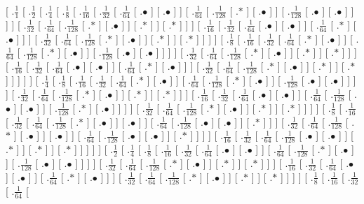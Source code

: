 \documentclass[a4paper,10pt]{article}
\begin{document}
\begin{landscape}
{[ .$\frac{1}{1}$  [ .$\frac{1}{2}$  [ .$\frac{1}{4}$  [ .$\frac{1}{8}$  [ .$\frac{1}{16}$  [ .$\frac{1}{32}$  [ .$\frac{1}{64}$  [ .$\bullet$ ]  [ .$\bullet$ ]  ]  [ .$\frac{1}{64}$  [ .$\frac{1}{128}$  [ .$*$ ]  [ .$\bullet$ ]  ]  [ .$\frac{1}{128}$  [ .$\bullet$ ]  [ .$\bullet$ ]  ]  ]  ]  [ .$\frac{1}{32}$  [ .$\frac{1}{64}$  [ .$\frac{1}{128}$  [ .$*$ ]  [ .$\bullet$ ]  ]  [ .$*$ ]  ]  [ .$*$ ]  ]  ]  [ .$\frac{1}{16}$  [ .$\frac{1}{32}$  [ .$\frac{1}{64}$  [ .$\bullet$ ]  [ .$\bullet$ ]  ]  [ .$\frac{1}{64}$  [ .$*$ ]  [ .$\bullet$ ]  ]  ]  [ .$\frac{1}{32}$  [ .$\frac{1}{64}$  [ .$\frac{1}{128}$  [ .$*$ ]  [ .$\bullet$ ]  ]  [ .$*$ ]  ]  [ .$*$ ]  ]  ]  ]  [ .$\frac{1}{8}$  [ .$\frac{1}{16}$  [ .$\frac{1}{32}$  [ .$\frac{1}{64}$  [ .$*$ ]  [ .$\bullet$ ]  ]  [ .$\frac{1}{64}$  [ .$\frac{1}{128}$  [ .$*$ ]  [ .$\bullet$ ]  ]  [ .$\frac{1}{128}$  [ .$\bullet$ ]  [ .$\bullet$ ]  ]  ]  ]  [ .$\frac{1}{32}$  [ .$\frac{1}{64}$  [ .$\frac{1}{128}$  [ .$*$ ]  [ .$\bullet$ ]  ]  [ .$*$ ]  ]  [ .$*$ ]  ]  ]  [ .$\frac{1}{16}$  [ .$\frac{1}{32}$  [ .$\frac{1}{64}$  [ .$\bullet$ ]  [ .$\bullet$ ]  ]  [ .$\frac{1}{64}$  [ .$*$ ]  [ .$\bullet$ ]  ]  ]  [ .$\frac{1}{32}$  [ .$\frac{1}{64}$  [ .$\frac{1}{128}$  [ .$*$ ]  [ .$\bullet$ ]  ]  [ .$*$ ]  ]  [ .$*$ ]  ]  ]  ]  ]  [ .$\frac{1}{4}$  [ .$\frac{1}{8}$  [ .$\frac{1}{16}$  [ .$\frac{1}{32}$  [ .$\frac{1}{64}$  [ .$*$ ]  [ .$\bullet$ ]  ]  [ .$\frac{1}{64}$  [ .$\frac{1}{128}$  [ .$*$ ]  [ .$\bullet$ ]  ]  [ .$\frac{1}{128}$  [ .$\bullet$ ]  [ .$\bullet$ ]  ]  ]  ]  [ .$\frac{1}{32}$  [ .$\frac{1}{64}$  [ .$\frac{1}{128}$  [ .$*$ ]  [ .$\bullet$ ]  ]  [ .$*$ ]  ]  [ .$*$ ]  ]  ]  [ .$\frac{1}{16}$  [ .$\frac{1}{32}$  [ .$\frac{1}{64}$  [ .$\bullet$ ]  [ .$\bullet$ ]  ]  [ .$\frac{1}{64}$  [ .$\frac{1}{128}$  [ .$\bullet$ ]  [ .$\bullet$ ]  ]  [ .$\frac{1}{128}$  [ .$*$ ]  [ .$\bullet$ ]  ]  ]  ]  [ .$\frac{1}{32}$  [ .$\frac{1}{64}$  [ .$\frac{1}{128}$  [ .$*$ ]  [ .$\bullet$ ]  ]  [ .$*$ ]  ]  [ .$*$ ]  ]  ]  ]  [ .$\frac{1}{8}$  [ .$\frac{1}{16}$  [ .$\frac{1}{32}$  [ .$\frac{1}{64}$  [ .$\frac{1}{128}$  [ .$*$ ]  [ .$\bullet$ ]  ]  [ .$\bullet$ ]  ]  [ .$\frac{1}{64}$  [ .$\frac{1}{128}$  [ .$\bullet$ ]  [ .$\bullet$ ]  ]  [ .$*$ ]  ]  ]  [ .$\frac{1}{32}$  [ .$\frac{1}{64}$  [ .$\frac{1}{128}$  [ .$*$ ]  [ .$\bullet$ ]  ]  [ .$\bullet$ ]  ]  [ .$\frac{1}{64}$  [ .$\frac{1}{128}$  [ .$\bullet$ ]  [ .$\bullet$ ]  ]  [ .$*$ ]  ]  ]  ]  [ .$\frac{1}{16}$  [ .$\frac{1}{32}$  [ .$\frac{1}{64}$  [ .$\frac{1}{128}$  [ .$\bullet$ ]  [ .$\bullet$ ]  ]  [ .$*$ ]  ]  [ .$*$ ]  ]  [ .$*$ ]  ]  ]  ]  ]  [ .$\frac{1}{2}$  [ .$\frac{1}{4}$  [ .$\frac{1}{8}$  [ .$\frac{1}{16}$  [ .$\frac{1}{32}$  [ .$\frac{1}{64}$  [ .$\bullet$ ]  [ .$\bullet$ ]  ]  [ .$\frac{1}{64}$  [ .$\frac{1}{128}$  [ .$*$ ]  [ .$\bullet$ ]  ]  [ .$\frac{1}{128}$  [ .$\bullet$ ]  [ .$\bullet$ ]  ]  ]  ]  [ .$\frac{1}{32}$  [ .$\frac{1}{64}$  [ .$\frac{1}{128}$  [ .$*$ ]  [ .$\bullet$ ]  ]  [ .$*$ ]  ]  [ .$*$ ]  ]  ]  [ .$\frac{1}{16}$  [ .$\frac{1}{32}$  [ .$\frac{1}{64}$  [ .$\bullet$ ]  [ .$\bullet$ ]  ]  [ .$\frac{1}{64}$  [ .$*$ ]  [ .$\bullet$ ]  ]  ]  [ .$\frac{1}{32}$  [ .$\frac{1}{64}$  [ .$\frac{1}{128}$  [ .$*$ ]  [ .$\bullet$ ]  ]  [ .$*$ ]  ]  [ .$*$ ]  ]  ]  ]  [ .$\frac{1}{8}$  [ .$\frac{1}{16}$  [ .$\frac{1}{32}$  [ .$\frac{1}{64}$  [ }
\end{landscape}
\end{document}
